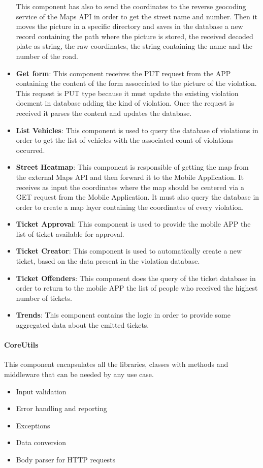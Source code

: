 \begin{itemize}
  This component has also to send the coordinates to the reverse geocoding service of the Maps API in order to get the street name and number. Then it moves the picture in a specific directory and saves in the database a new record containing the path where the picture is stored, the received decoded plate as string, the raw coordinates, the string containing the name and the number of the road.
  \item \textbf{Get form}: This component receives the PUT request from the APP containing the content of the form assocciated to the picture of the violation. This request is PUT type because it must update the existing violation docment in database adding the kind of violation. Once the request is received it parses the content and updates the database.
  \item \textbf{List Vehicles}: This component is used to query the database of violations in order to get the list of vehicles with the associated count of violations occurred.
  \item \textbf{Street Heatmap}: This component is responsible of getting the map from the external Maps API and then forward it to the Mobile Application. It receives as input the coordinates where the map should be centered via a GET request from the Mobile Application. It must also query the database in order to create a map layer containing the coordinates of every violation.
  \item \textbf{Ticket Approval}: This component is used to provide the mobile APP the list of ticket available for approval.
  \item \textbf{Ticket Creator}: This component is used to automatically create a new ticket, based on the data present in the violation database.
  \item \textbf{Ticket Offenders}: This component does the query of the ticket database in order to return to the mobile APP the list of people who received the highest number of tickets.
  \item \textbf{Trends}: This component contains the logic in order to provide some aggregated data about the emitted tickets.
\end{itemize}

\paragraph{CoreUtils}
This component encapsulates all the libraries, classes with methods and middleware that can be needed by any use case.
\begin{itemize}
  \item Input validation
  \item Error handling and reporting
  \item Exceptions
  \item Data conversion
  \item Body parser for HTTP requests
\end{itemize}

